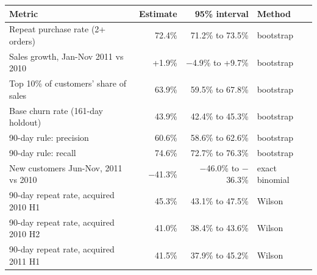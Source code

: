 \begin{tabularx}{\textwidth}{Xrrl}
\toprule
Metric & Estimate & 95\% interval & Method \\
\midrule
Repeat purchase rate (2+ orders) & 72.4\% & 71.2\% to 73.5\% & bootstrap \\
Sales growth, Jan-Nov 2011 vs 2010 & +1.9\% & $-$4.9\% to +9.7\% & bootstrap \\
Top 10\% of customers' share of sales & 63.9\% & 59.5\% to 67.8\% & bootstrap \\
Base churn rate (161-day holdout) & 43.9\% & 42.4\% to 45.3\% & bootstrap \\
90-day rule: precision & 60.6\% & 58.6\% to 62.6\% & bootstrap \\
90-day rule: recall & 74.6\% & 72.7\% to 76.3\% & bootstrap \\
New customers Jun-Nov, 2011 vs 2010 & $-$41.3\% & $-$46.0\% to $-$36.3\% & exact binomial \\
90-day repeat rate, acquired 2010 H1 & 45.3\% & 43.1\% to 47.5\% & Wilson \\
90-day repeat rate, acquired 2010 H2 & 41.0\% & 38.4\% to 43.6\% & Wilson \\
90-day repeat rate, acquired 2011 H1 & 41.5\% & 37.9\% to 45.2\% & Wilson \\
\bottomrule
\end{tabularx}
